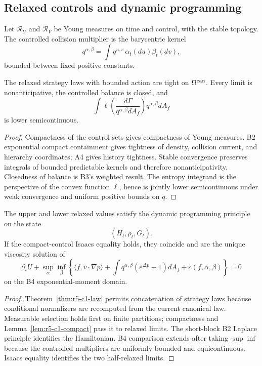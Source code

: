 \subsection{Relaxed controls and dynamic programming}

Let \({\mathcal R}_U\) and \({\mathcal R}_V\) be Young measures on time and
control, with the stable topology.  The controlled collision multiplier is
the barycentric kernel
\[
 q^{\alpha,\beta}
 =\int q^{u,v}\,\alpha_t(du)\beta_t(dv),
\]
bounded between fixed positive constants.

\begin{lemma}
\label{lem:r5-c1-compact}
The relaxed strategy laws with bounded action are tight on
\(\Omega^{\rm can}\).  Every limit is nonanticipative, the controlled balance
is closed, and
\[
 \int\ell\left(\frac{d\Gamma}
 {q^{\alpha,\beta}dA_f}\right)
 q^{\alpha,\beta}dA_f
\]
is lower semicontinuous.
\end{lemma}

\begin{proof}
Compactness of the control sets gives compactness of Young measures.
B2 exponential compact containment gives tightness of density, collision
current, and hierarchy coordinates; A4 gives history tightness.  Stable
convergence preserves integrals of bounded predictable kernels and therefore
nonanticipativity.  Closedness of balance is B3's weighted result.
The entropy integrand is the perspective of the convex function \(\ell\),
hence is jointly lower semicontinuous under weak convergence and uniform
positive bounds on \(q\).
\end{proof}

\begin{theorem}
\label{thm:r5-c1-dpp}
The upper and lower relaxed values satisfy the dynamic programming principle
on the state
\[
 (H_t,\rho_t,G_t).
\]
If the compact-control Isaacs equality holds, they coincide and are the
unique viscosity solution of
\[
 \partial_tU+
 \sup_\alpha\inf_\beta
 \left\{
 \langle f,v\cdot\nabla p\rangle+
 \int q^{\alpha,\beta}(e^{\Delta p}-1)dA_f+
 c(f,\alpha,\beta)
 \right\}=0
\]
on the B4 exponential-moment domain.
\end{theorem}

\begin{proof}
Theorem~\ref{thm:r5-c1-law} permits concatenation of strategy laws because
conditional normalizers are recomputed from the current canonical law.
Measurable selection holds first on finite partitions; compactness and
Lemma~\ref{lem:r5-c1-compact} pass it to relaxed limits.  The short-block B2
Laplace principle identifies the Hamiltonian.  B4 comparison extends after
taking \(\sup\inf\) because the controlled multipliers are uniformly bounded
and equicontinuous.  Isaacs equality identifies the two half-relaxed limits.
\end{proof}

